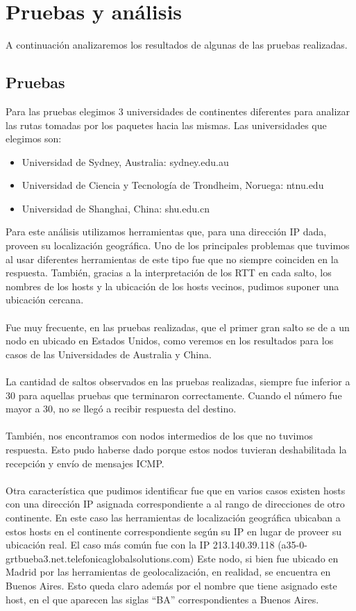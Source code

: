\section{Pruebas y análisis}

A continuación analizaremos los resultados de algunas de las pruebas realizadas.

\subsection{Pruebas}
Para las pruebas elegimos 3 universidades de continentes diferentes para analizar las rutas tomadas por los paquetes hacia las mismas. Las universidades que elegimos son:
\begin{itemize}
\item Universidad de Sydney, Australia: sydney.edu.au
\item Universidad de Ciencia y Tecnología de Trondheim, Noruega: ntnu.edu
\item Universidad de Shanghai, China: shu.edu.cn
\end{itemize}

Para este análisis utilizamos herramientas que, para una dirección IP dada, proveen su localización geográfica. Uno de los principales problemas que tuvimos al usar diferentes herramientas de este tipo fue que no siempre coinciden en la respuesta.  
También, gracias a la interpretación de los RTT en cada salto, los nombres de los hosts y la ubicación de los hosts vecinos, pudimos suponer una ubicación cercana. 
\\\\
Fue muy frecuente, en las pruebas realizadas, que el primer gran salto se de a un nodo en ubicado en Estados Unidos, como veremos en los resultados para los casos de las Universidades de Australia y China. 
\\\\
La cantidad de saltos observados en las pruebas realizadas, siempre fue inferior a 30 para aquellas pruebas que terminaron correctamente. Cuando el número fue mayor a 30, no se llegó a recibir respuesta del destino.
\\\\
También, nos encontramos con nodos intermedios de los que no tuvimos respuesta. Esto pudo haberse dado porque estos nodos tuvieran deshabilitada la recepción y envío de mensajes ICMP.
\\\\
Otra característica que pudimos identificar fue que en varios casos existen hosts con una dirección IP asignada correspondiente a al rango de direcciones de otro continente. En este caso las herramientas de localización geográfica ubicaban a estos hosts en el continente correspondiente según su IP en lugar de proveer su ubicación real.
El caso más común fue con la IP 213.140.39.118 (a35-0-grtbueba3.net.telefonicaglobalsolutions.com) Este nodo, si bien fue ubicado en Madrid por las herramientas de geolocalización, en realidad, se encuentra en Buenos Aires. Esto queda claro además por el nombre que tiene asignado este host, en el que aparecen las siglas “BA” correspondientes a Buenos Aires.


